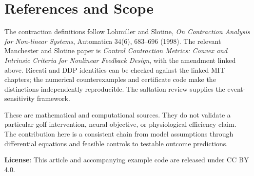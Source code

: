 \documentclass[
  10pt,
  letterpaper,
  DIV=11,
  numbers=noendperiod]{scrartcl}
\begin{document}
\section*{References and Scope}\label{references-and-scope}

The contraction definitions follow Lohmiller and Slotine, \emph{On
Contraction Analysis for Non-linear Systems}, Automatica 34(6), 683--696
(1998). The relevant Manchester and Slotine paper is \emph{Control
Contraction Metrics: Convex and Intrinsic Criteria for Nonlinear
Feedback Design}, with the amendment linked above. Riccati and DDP
identities can be checked against the linked MIT chapters; the numerical
counterexamples and certificate code make the distinctions independently
reproducible. The saltation review supplies the event-sensitivity
framework.

These are mathematical and computational sources. They do not validate a
particular golf intervention, neural objective, or physiological
efficiency claim. The contribution here is a consistent chain from model
assumptions through differential equations and feasible controls to
testable outcome predictions.

\textbf{License}: This article and accompanying example code are
released under CC BY 4.0.
\end{document}
